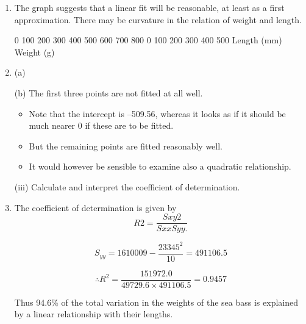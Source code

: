 \documentclass[a4paper,12pt]{article}
\begin{document}
\begin{enumerate} 
\item  The graph suggests that a linear fit will be reasonable, at least as a first approximation.  There may be curvature in the relation of weight and length. 
 
 
0
100
200
300
400
500
600
700
800
0 100 200 300 400 500 Length (mm)
Weight (g)
 
 
\item  (a) 

\begin{itemize}
    \item $\hat{beta}_1 = \frac{S_{xy} }{S_{xx}$
    
    \item $ \sum(x_iy_i) - \frac{\sum(x_i) \sum(y_i)}{n} = 1075861 - \frac{2762\times 3345}{10} = 151972.0$
    
    
    \item $S_{xx} = 812594 - \frac{(2761)^2}{10} = 49729.6$
    
    
    \item $\hat{\beta}_1 = 3.056$
    
    
    \item $\hat{\beta}_0 = \bar{y} - \hat{\beta}_1 \bar{x}  = 334.5 - (3.056\times 276.2) = -509.56$
\end{itemize}
 
 
 
 (b) The first three points are not fitted at all well. 
 
 \begin{itemize}
     \item Note that the intercept is –509.56, whereas it looks as if it should be much nearer 0 if these are to be fitted.  
     \item But the remaining points are fitted reasonably well. 
     \item It would however be sensible to examine also a quadratic relationship. 
 \end{itemize}
\newpage 
\begin{framed}
(iii) Calculate and interpret the coefficient of determination. 
\end{framed} 
\item  The coefficient of determination is given by 
\[R2 = \frac{Sxy2}{SxxSyy.}\] 


\[  S_{yy} = 1610009 - \frac{23345^2}{10} =  491106.5 \]
 
\[ \therefore R^2 = \frac{151972.0}{49729.6 \times 491106.5} =  0.9457  \]
 
Thus 94.6\% of the total variation in the weights of the sea bass is explained by a linear relationship with their lengths. 
\end{enumerate}
\end{document}
